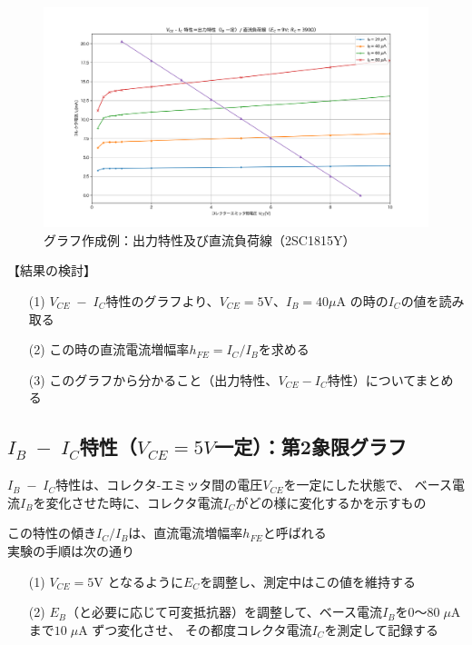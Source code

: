 \documentclass[uplatex,a4paper,11pt,oneside,openany]{jsbook}
\begin{document}
\newpage

\begin{figure}[H]
  \centering
   \includegraphics[keepaspectratio, scale=0.45, angle=0]
               {figs/png/x1static.png}
               \caption{グラフ作成例：出力特性及び直流負荷線（2SC1815Y）}
               \label{fig:iocharM1Yd}
\end{figure}

【結果の検討】

\begin{enumerate}
\item[(1)] $V_{CE}\;-\;I_C$特性のグラフより、$V_{CE}=5$V、$I_B=40\mu$A の時の$I_C$の値を読み取る\\
\item[(2)] この時の直流電流増幅率$h_{FE}=I_C/I_B$を求める\\
\item[(3)] このグラフから分かること（出力特性、$V_{CE}-I_C$特性）についてまとめる
\end{enumerate}

\newpage

\subsection{$I_B\;-\;I_C$特性（$V_{CE}=5V$一定）：第2象限グラフ}

$I_B\;-\;I_C$特性は、コレクタ-エミッタ間の電圧$V_{CE}$を一定にした状態で、
ベース電流$I_B$を変化させた時に、コレクタ電流$I_C$がどの様に変化するかを示すもの

この特性の傾き$I_C/I_B$は、直流電流増幅率$h_{FE}$と呼ばれる\\

実験の手順は次の通り

\begin{enumerate}
\item[(1)] $V_{CE}=5$V となるように$E_C$を調整し、測定中はこの値を維持する
\item[(2)] $E_B$（と必要に応じて可変抵抗器）を調整して、ベース電流$I_B$を$0$〜$80\;\mu$A まで$10\;\mu$A ずつ変化させ、
その都度コレクタ電流$I_C$を測定して記録する 
\end{enumerate}
\end{document}
